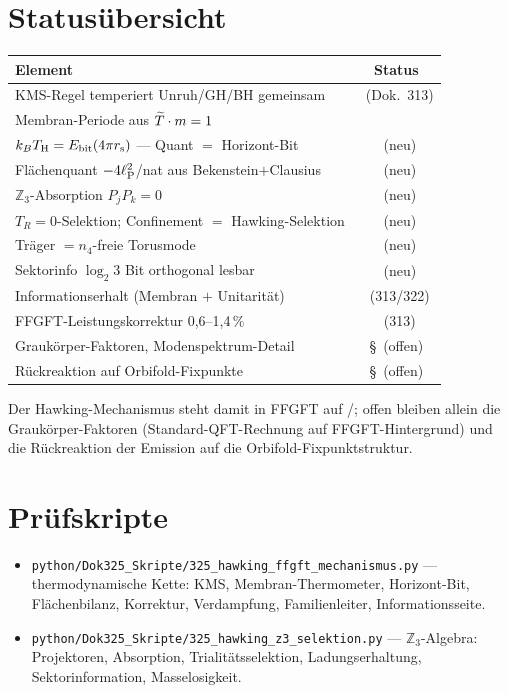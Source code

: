 \section{Statusübersicht}

\begin{center}
\begin{tabular}{@{}lc@{}}
  \toprule
  \textbf{Element} & \textbf{Status} \\
  \midrule
  KMS-Regel temperiert Unruh/GH/BH gemeinsam & \K\ (Dok.\ 313) \\
  Membran-Periode aus $\widetilde{T}\cdot m = 1$ & \K \\
  $k_BT_{\mathrm{H}} = E_{\mathrm{bit}}(4\pi r_{\mathrm{s}})$ — Quant $=$ Horizont-Bit & \K\ (neu) \\
  Flächenquant $-4\ell_{\mathrm{P}}^2$/nat aus Bekenstein$+$Clausius & \B\ (neu) \\
  $\mathbb{Z}_3$-Absorption $P_jP_k = 0$ & \B\ (neu) \\
  $T_R=0$-Selektion; Confinement $=$ Hawking-Selektion & \B\ (neu) \\
  Träger $= n_4$-freie Torusmode & \K\ (neu) \\
  Sektorinfo $\log_2 3$ Bit orthogonal lesbar & \B\ (neu) \\
  Informationserhalt (Membran $+$ Unitarität) & \K\ (313/322) \\
  FFGFT-Leistungskorrektur 0{,}6–1{,}4\,\% & \K\ (313) \\
  Graukörper-Faktoren, Modenspektrum-Detail & \S\ (offen) \\
  Rückreaktion auf Orbifold-Fixpunkte & \S\ (offen) \\
  \bottomrule
\end{tabular}
\end{center}

Der Hawking-Mechanismus steht damit in FFGFT auf \K/\B; offen bleiben
allein die Graukörper-Faktoren (Standard-QFT-Rechnung auf FFGFT-Hintergrund)
und die Rückreaktion der Emission auf die Orbifold-Fixpunktstruktur.

\section*{Prüfskripte}

\begin{itemize}
  \item \texttt{python/Dok325\_Skripte/325\_hawking\_ffgft\_mechanismus.py} —
    thermodynamische Kette: KMS, Membran-Thermometer, Horizont-Bit,
    Flächenbilanz, Korrektur, Verdampfung, Familienleiter,
    Informationsseite.
  \item \texttt{python/Dok325\_Skripte/325\_hawking\_z3\_selektion.py} —
    $\mathbb{Z}_3$-Algebra: Projektoren, Absorption, Trialitätsselektion,
    Ladungserhaltung, Sektorinformation, Masselosigkeit.
\end{itemize}

